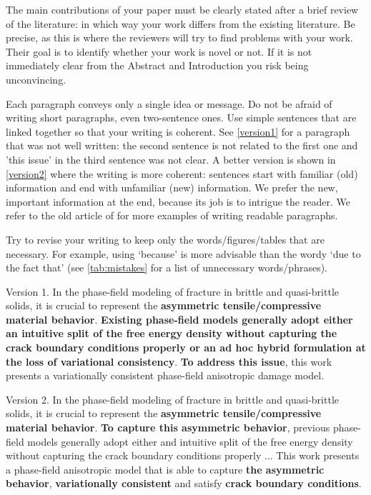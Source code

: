 \documentclass[authoryear,3p,times,preprint,review,fleqn]{elsarticle}
\numberwithin{equation}{section}
\theoremstyle{remark}
\begin{document}
The main contributions of your paper must be clearly stated after a brief review of the literature: in which way your work differs from the existing literature. Be precise, as this is where the reviewers will try to find problems with your work. Their goal is to identify whether your work is novel or not. If it is not immediately clear from the Abstract and Introduction you risk being unconvincing. 

Each paragraph conveys only a single idea or message. Do not be afraid of writing short paragraphs, even two-sentence ones. 
Use simple sentences that are linked together so that your writing is coherent. 
See \cref{version1} for a paragraph that was not well written: the second sentence is not related to the first one and 'this issue' in the third sentence was not clear. A better version is shown in \cref{version2} where the writing is more coherent: sentences start with familiar (old) information and end with unfamiliar (new) information. We prefer the new, important information at the end, because its job is to intrigue the reader. We refer to the old article of \cite{gopen1990science} for more examples of writing readable paragraphs.

Try to revise your writing to keep only the words/figures/tables that are necessary. For example, using `because' is more advisable than the wordy `due to the fact that' (see \cref{tab:mistakes} for a list of unnecessary words/phrases).\\

\begin{MyBox}[width=0.48\textwidth,nobeforeafter,label={version1}]
{Version 1.}
{
In the phase-field modeling of fracture in brittle and quasi-brittle solids, it is crucial to represent the \textbf{asymmetric tensile/compressive material behavior}. \textbf{Existing phase-field models generally adopt either an intuitive split of the free energy density without capturing the crack boundary conditions properly or an ad hoc hybrid formulation at the loss of variational consistency}. \textbf{To address this issue}, this work presents a variationally consistent phase-field anisotropic damage model.}
\end{MyBox}\hfill
\begin{MyBox}[width=0.48\textwidth,nobeforeafter,label={version2}]
{Version 2.}
{
In the phase-field modeling of fracture in brittle and quasi-brittle solids, it is crucial to represent the \textbf{asymmetric tensile/compressive material behavior}. \textbf{To capture this asymmetric behavior}, previous phase-field models  generally adopt either and intuitive split of the free energy density without capturing the crack boundary conditions properly ... This work presents a phase-field anisotropic model that is able to capture \textbf{the asymmetric behavior}, \textbf{variationally consistent} and satisfy \textbf{crack boundary conditions}.}
\end{MyBox}
\end{document}
